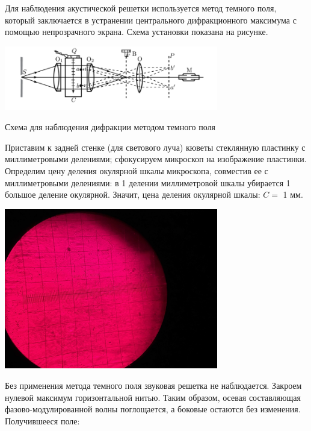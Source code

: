 \documentclass[a4paper,12pt]{article}
\begin{document}
Для наблюдения акустической решетки используется метод темного поля, который заключается в устранении центрального дифракционного максимума с помощью непрозрачного экрана. Схема установки показана на рисунке.

\begin{center}

\includegraphics[width=0.7\textwidth]{3.png}
	
Схема для наблюдения дифракции методом темного поля
\label{shema2}
\end{center}

Приставим к задней стенке (для светового луча) кюветы стеклянную пластинку с миллиметровыми делениями; сфокусируем микроскоп на изображение пластинки. Определим цену деления окулярной шкалы микроскопа, совместив ее с миллиметровыми делениями: в 1 делении миллиметровой шкалы убирается 1 большое деление окулярной. Значит, цена деления окулярной шкалы: $ C = $ 1 мм.

\begin{center}
	
	\includegraphics[width=0.7\textwidth]{pic3.jpg}
	
\end{center}

Без применения метода темного поля звуковая решетка не наблюдается. Закроем нулевой максимум горизонтальной нитью. Таким образом, осевая составляющая фазово-модулированной волны поглощается, а боковые остаются без изменения. Получившееся поле: 
\end{document}
